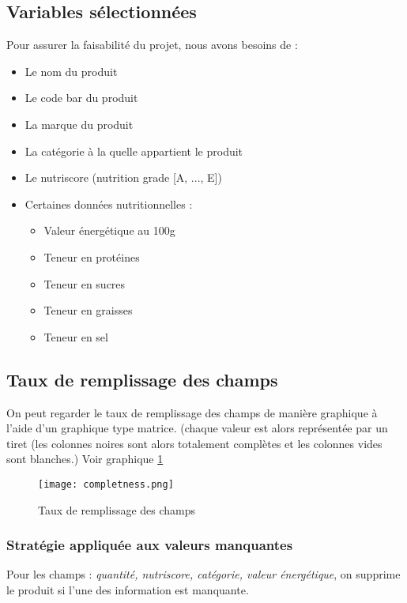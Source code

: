     \subsection{Variables sélectionnées}
    Pour assurer la faisabilité du projet, nous avons besoins de :
    \begin{itemize}
      \item Le nom du produit
      \item Le code bar du produit
      \item La marque du produit
      \item La catégorie à la quelle appartient le produit
      \item Le nutriscore (nutrition grade [A, ..., E])
      \item Certaines données nutritionnelles :
      \begin{itemize}
        \item Valeur énergétique au 100g
        \item Teneur en protéines
        \item Teneur en sucres
        \item Teneur en graisses
        \item Teneur en sel
      \end{itemize}
    \end{itemize}

    \subsection{Taux de remplissage des champs}

    On peut regarder le taux de remplissage des champs de manière graphique à
    l'aide d'un graphique type matrice. (chaque valeur est alors représentée
    par un tiret (les colonnes noires sont alors totalement complètes et les
    colonnes vides sont blanches.) Voir graphique \ref{completness}

    \begin{figure}[H]
      \texttt{[image: completness.png]}
      \caption{Taux de remplissage des champs}
      \label{completness}
    \end{figure}

      \subsubsection{Stratégie appliquée aux valeurs manquantes}

      Pour les champs : \emph{quantité, nutriscore, catégorie, valeur énergétique}, on
      supprime le produit si l'une des information est manquante.

